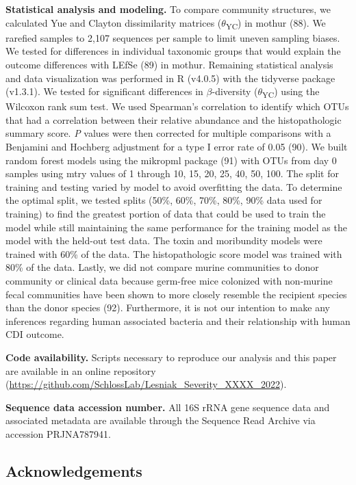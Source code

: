 \documentclass[
  12pt,
]{article}
\begin{document}
\textbf{Statistical analysis and modeling.} To compare community
structures, we calculated Yue and Clayton dissimilarity matrices
(\(\theta\)\textsubscript{YC}) in mothur (88). We rarefied samples to
2,107 sequences per sample to limit uneven sampling biases. We tested
for differences in individual taxonomic groups that would explain the
outcome differences with LEfSe (89) in mothur. Remaining statistical
analysis and data visualization was performed in R (v4.0.5) with the
tidyverse package (v1.3.1). We tested for significant differences in
\(\beta\)-diversity (\(\theta\)\textsubscript{YC}) using the Wilcoxon
rank sum test. We used Spearman's correlation to identify which OTUs
that had a correlation between their relative abundance and the
histopathologic summary score. \emph{P} values were then corrected for
multiple comparisons with a Benjamini and Hochberg adjustment for a type
I error rate of 0.05 (90). We built random forest models using the
mikropml package (91) with OTUs from day 0 samples using mtry values of
1 through 10, 15, 20, 25, 40, 50, 100. The split for training and
testing varied by model to avoid overfitting the data. To determine the
optimal split, we tested splits (50\%, 60\%, 70\%, 80\%, 90\% data used
for training) to find the greatest portion of data that could be used to
train the model while still maintaining the same performance for the
training model as the model with the held-out test data. The toxin and
moribundity models were trained with 60\% of the data. The
histopathologic score model was trained with 80\% of the data. Lastly,
we did not compare murine communities to donor community or clinical
data because germ-free mice colonized with non-murine fecal communities
have been shown to more closely resemble the recipient species than the
donor species (92). Furthermore, it is not our intention to make any
inferences regarding human associated bacteria and their relationship
with human CDI outcome.

\textbf{Code availability.} Scripts necessary to reproduce our analysis
and this paper are available in an online repository
(\url{https://github.com/SchlossLab/Lesniak_Severity_XXXX_2022}).

\textbf{Sequence data accession number.} All 16S rRNA gene sequence data
and associated metadata are available through the Sequence Read Archive
via accession PRJNA787941.

\hypertarget{acknowledgements}{%
\subsection{Acknowledgements}\label{acknowledgements}}
\end{document}
